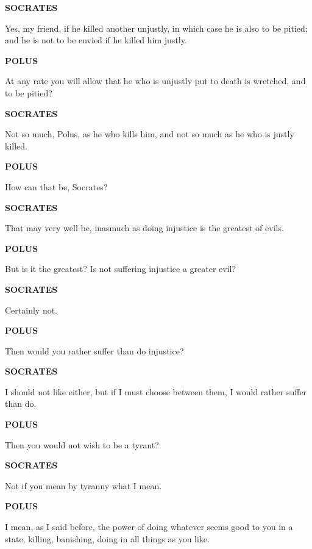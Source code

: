 \documentclass[11pt,letter]{article}
\begin{document}
\par \textbf{SOCRATES}
\par   Yes, my friend, if he killed another unjustly, in which case he is also to be pitied; and he is not to be envied if he killed him justly.

\par \textbf{POLUS}
\par   At any rate you will allow that he who is unjustly put to death is wretched, and to be pitied?

\par \textbf{SOCRATES}
\par   Not so much, Polus, as he who kills him, and not so much as he who is justly killed.

\par \textbf{POLUS}
\par   How can that be, Socrates?

\par \textbf{SOCRATES}
\par   That may very well be, inasmuch as doing injustice is the greatest of evils.

\par \textbf{POLUS}
\par   But is it the greatest? Is not suffering injustice a greater evil?

\par \textbf{SOCRATES}
\par   Certainly not.

\par \textbf{POLUS}
\par   Then would you rather suffer than do injustice?

\par \textbf{SOCRATES}
\par   I should not like either, but if I must choose between them, I would rather suffer than do.

\par \textbf{POLUS}
\par   Then you would not wish to be a tyrant?

\par \textbf{SOCRATES}
\par   Not if you mean by tyranny what I mean.

\par \textbf{POLUS}
\par   I mean, as I said before, the power of doing whatever seems good to you in a state, killing, banishing, doing in all things as you like.
\end{document}
